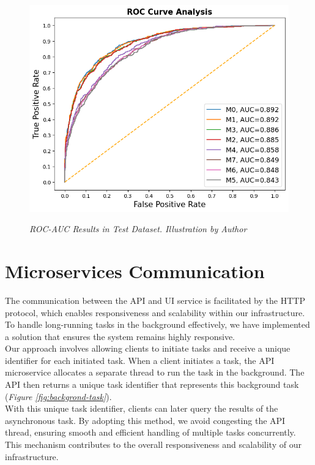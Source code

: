 \begin{figure}[H]
\centering
    \includegraphics[width=\textwidth]{imatges/results/rocaucanalysis-all.png}
\caption[ROC-AUC Results in Test Dataset]{\textit{ROC-AUC Results in Test Dataset. Illustration by Author}}
{\label{fig:rocaucanalysis-all}}
\end{figure}

\newpage


\section{Microservices Communication}

The communication between the API and UI service is facilitated by the HTTP protocol,
which enables responsiveness and scalability within our infrastructure. To handle long-running tasks in the background effectively,
we have implemented a solution that ensures the system remains highly responsive. \\

Our approach involves allowing clients to initiate tasks and receive a unique identifier for each initiated task. When a client initiates a task,
the API microservice allocates a separate thread to run the task in the background.
The API then returns a unique task identifier that represents this background task (\textit{Figure \ref{fig:backgrond-task}}). \\

With this unique task identifier, clients can later query the results of the asynchronous task.
By adopting this method, we avoid congesting the API thread, ensuring smooth and efficient handling of multiple tasks concurrently.
This mechanism contributes to the overall responsiveness and scalability of our infrastructure.

